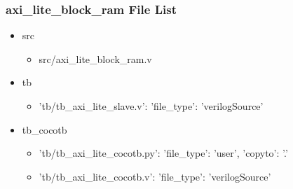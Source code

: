 \subsubsection{axi\_lite\_block\_ram File List}
\begin{itemize}
\item src
	\begin{itemize}
	\item src/axi\_lite\_block\_ram.v
	\end{itemize}
\item tb
	\begin{itemize}
	\item {'tb/tb\_axi\_lite\_slave.v': {'file\_type': 'verilogSource'}}
	\end{itemize}
\item tb\_cocotb
	\begin{itemize}
	\item {'tb/tb\_axi\_lite\_cocotb.py': {'file\_type': 'user', 'copyto': '.'}}
	\item {'tb/tb\_axi\_lite\_cocotb.v': {'file\_type': 'verilogSource'}}
	\end{itemize}
\end{itemize}

